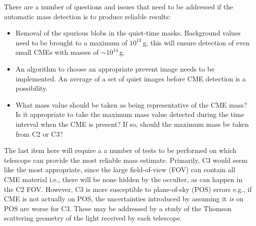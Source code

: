 There are a number of questions and issues that need to be addressed if the automatic mass detection is to produce reliable results:
\begin{itemize}
\item Removal of the spurious blobs in the quiet-time masks. Background values need to be brought to a maximum of $10^{13}$\,g, this will ensure detection of even small CMEs with masses of $\sim$$10^{14}$\,g.
\item An algorithm to choose an appropriate prevent image needs to be implemented. An average of a set of quiet images before CME detection is a possibility. 
\item What mass value should be taken as being representative of the CME mass? Is it appropriate to take the maximum mass value detected during the time interval when the CME is present? If so, should the maximum mass be taken from C2 or C3?
\end{itemize}
The last item here will require a a number of tests to be performed on which telescope can provide the most reliable mass estimate. Primarily, C3 would seem like the most appropriate, since the large field-of-view (FOV) can contain all CME material i.e., there will be none hidden by the occulter, as can happen in the C2 FOV. However, C3 is more susceptible to plane-of-sky (POS) errors e.g., if CME is not actually on POS, the uncertainties introduced by assuming it \emph{is} on POS are worse for C3. 
These may be addressed by a study of the Thomson scattering geometry of the light received by each telescope.

